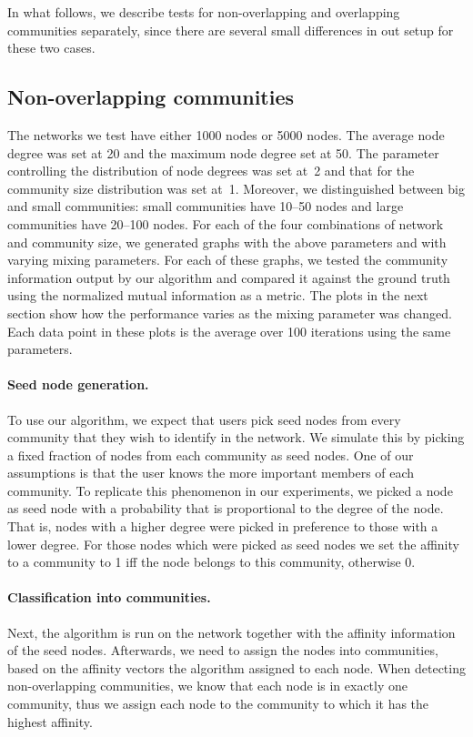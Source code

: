 In what follows, we describe tests for non-overlapping and overlapping communities separately, since 
there are several small differences in out setup for these two cases. 

\subsection{Non-overlapping communities}
The networks we test have either 1000 nodes or 5000 nodes. The average node degree
was set at 20 and the maximum node degree set at 50. The parameter controlling the 
distribution of node degrees was set at~2 and that for the community size distribution was 
set at~1. Moreover, we distinguished between big and small communities: small communities have 
10--50 nodes and large communities have 20--100 nodes. 
For each of the four combinations of network and community size, we generated graphs with the 
above parameters and with varying mixing parameters. For each of these graphs, we tested the 
community information output by our algorithm and compared it against the ground truth 
using the normalized mutual information as a metric. The plots in the next section 
show how the performance varies as the mixing parameter was changed. Each data point in 
these plots is the average over 100 iterations using the same parameters. 

\paragraph{Seed node generation.} 
To use our algorithm, we expect that users pick seed nodes from 
every community that they wish to identify in the network. 
We simulate this by picking a fixed fraction of nodes from each community as seed nodes.
One of our assumptions is that the user knows the more important members of each community. 
To replicate this phenomenon in our experiments, we picked a node as seed node
with a probability that is proportional to the degree of the node.
That is, nodes with a higher degree were picked in preference to those with a lower degree.
For those nodes which were picked as seed nodes we set the affinity to a community to 1 iff
the node belongs to this community, otherwise 0.

\paragraph{Classification into communities.}
Next, the algorithm is run on the network together with the affinity information of the seed nodes.
Afterwards, we need to assign the nodes into communities, 
based on the affinity vectors the algorithm assigned to each node.
When detecting non-overlapping communities, we know that each node is in exactly one community,
thus we assign each node to the community to which it has the highest affinity.

